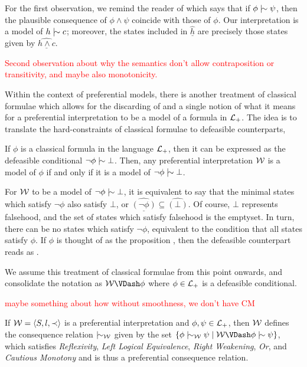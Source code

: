 \begin{example}
	For the first observation, we remind the reader of  which says that if $\phi \twiddle \psi$,
	then the plausible consequence of $\phi \land \psi$ coincide with those of $\phi$. Our interpretation is a model of $h
	\twiddle c$; moreover, the states included in $\underline{\hat{h}}$ are precisely those states given by $\underline{\widehat{h \land c}}$.

	\textcolor{red}{Second observation about why the semantics don't allow contraposition or transitivity, and maybe also monotonicity.}
\end{example}

Within the context of preferential models, there is another treatment of classical formulae which allows for the discarding
of  and a single notion of what it means for a preferential interpretation to be a model
of a formula in $\mathcal{L}_+$. The idea is to translate the hard-constraints of classical formulae to defeasible counterparts,

\begin{lemma}
	\label{lemma:classical-to-defeasible} If $\phi$ is a classical formula in the language $\mathcal{L}_+$, then it can be
	expressed as the defeasible conditional $\neg \phi \twiddle \bot$. Then, any preferential interpretation $\mathcal{W}$ is a
	model of $\phi$ if and only if it is a model of $\neg \phi \twiddle \bot$.
\end{lemma}

For $\mathcal{W}$ to be a model of $\neg \phi \twiddle \bot$, it is equivalent to say that the minimal states which satisfy
$\neg \phi$ also satisfy $\bot$, or $\underline{\hat{(\neg \phi)}}\subseteq \hat{(\bot)}$. Of course, $\bot$ represents falsehood,
and the set of states which satisfy falsehood is the emptyset. In turn, there can be no states which satisfy $\neg \phi$,
equivalent to the condition that all states satisfy $\phi$. If $\phi$ is thought of as the proposition ,
then the defeasible counterpart reads as 
\cite{kraus1990nonmonotonic,lehmann1992what}.

We assume this treatment of classical formulae from this point onwards, and consolidate the notation as
$\pin \VDash \phi$ where $\phi \in \mathcal{L}_+$ is a defeasible conditional.

\textcolor{red}{maybe something about how without smoothness, we don't have CM}

\begin{theorem}[Soundness]
	\label{theorem:soundness-preferential}

	If $\mathcal{W} = \langle S,l,\prec \rangle$ is a preferential interpretation and $\phi, \psi \in \mathcal{L}_+$, then $\mathcal{W}$ defines the consequence relation $\twiddle
	_{\pin}$ given by the set $\{\phi \twiddle_{\pin}\psi \mid \pin \VDash \phi \twiddle \psi\}$, which satisfies \textit{Reflexivity},
	\textit{Left Logical Equivalence}, \textit{Right Weakening}, \textit{Or}, and \textit{Cautious Monotony} and is thus a
	preferential consequence relation.
\end{theorem}

